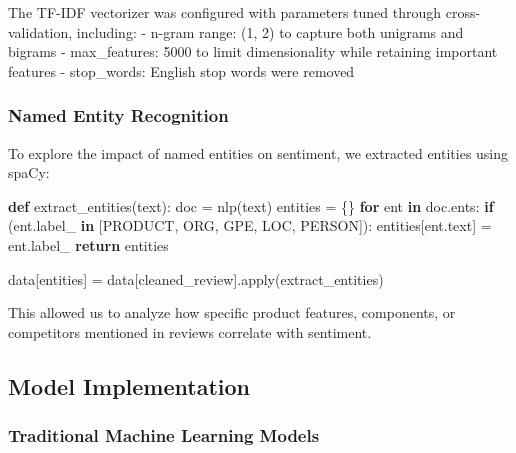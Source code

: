 \documentclass[
]{article}
\newenvironment{Shaded}{\begin{snugshade}}{\end{snugshade}}
\newcommand{\BuiltInTok}[1]{\textcolor[rgb]{0.00,0.23,0.31}{#1}}
\newcommand{\ControlFlowTok}[1]{\textcolor[rgb]{0.00,0.23,0.31}{\textbf{#1}}}
\newcommand{\KeywordTok}[1]{\textcolor[rgb]{0.00,0.23,0.31}{\textbf{#1}}}
\newcommand{\NormalTok}[1]{\textcolor[rgb]{0.00,0.23,0.31}{#1}}
\newcommand{\OperatorTok}[1]{\textcolor[rgb]{0.37,0.37,0.37}{#1}}
\newcommand{\StringTok}[1]{\textcolor[rgb]{0.13,0.47,0.30}{#1}}
\begin{document}
The TF-IDF vectorizer was configured with parameters tuned through
cross-validation, including: - n-gram range: (1, 2) to capture both
unigrams and bigrams - max\_features: 5000 to limit dimensionality while
retaining important features - stop\_words: English stop words were
removed

\subsubsection{Named Entity Recognition}\label{named-entity-recognition}

To explore the impact of named entities on sentiment, we extracted
entities using spaCy:

\begin{Shaded}
\begin{Highlighting}[]
\KeywordTok{def}\NormalTok{ extract\_entities(text):}
\NormalTok{    doc }\OperatorTok{=}\NormalTok{ nlp(text)}
\NormalTok{    entities }\OperatorTok{=}\NormalTok{ \{\}}
    \ControlFlowTok{for}\NormalTok{ ent }\KeywordTok{in}\NormalTok{ doc.ents:}
        \ControlFlowTok{if}\NormalTok{ (ent.label\_ }\KeywordTok{in}\NormalTok{ [}\StringTok{\textquotesingle{}PRODUCT\textquotesingle{}}\NormalTok{, }\StringTok{\textquotesingle{}ORG\textquotesingle{}}\NormalTok{, }\StringTok{\textquotesingle{}GPE\textquotesingle{}}\NormalTok{, }\StringTok{\textquotesingle{}LOC\textquotesingle{}}\NormalTok{, }\StringTok{\textquotesingle{}PERSON\textquotesingle{}}\NormalTok{]):}
\NormalTok{            entities[ent.text] }\OperatorTok{=}\NormalTok{ ent.label\_}
    \ControlFlowTok{return}\NormalTok{ entities}

\NormalTok{data[}\StringTok{\textquotesingle{}entities\textquotesingle{}}\NormalTok{] }\OperatorTok{=}\NormalTok{ data[}\StringTok{\textquotesingle{}cleaned\_review\textquotesingle{}}\NormalTok{].}\BuiltInTok{apply}\NormalTok{(extract\_entities)}
\end{Highlighting}
\end{Shaded}

This allowed us to analyze how specific product features, components, or
competitors mentioned in reviews correlate with sentiment.

\subsection{Model Implementation}\label{model-implementation}

\subsubsection{Traditional Machine Learning
Models}\label{traditional-machine-learning-models}
\end{document}
